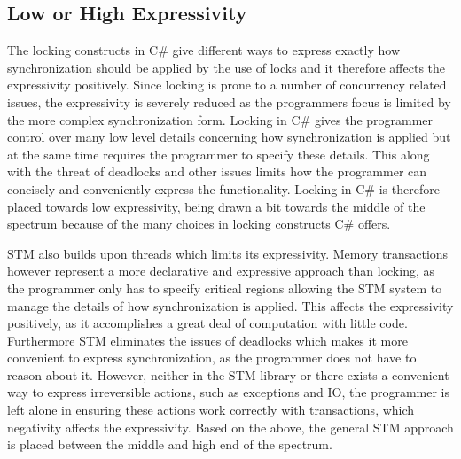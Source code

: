 \subsection{Low or High Expressivity}\label{subsec:expressivity}
The locking constructs in C\# give different ways to express exactly how synchronization should be applied by the use of locks and it therefore affects the expressivity positively. Since locking is prone to a number of concurrency related issues, the expressivity is severely reduced as the programmers focus is limited by the more complex synchronization form. Locking in C\# gives the programmer control over many low level details concerning how synchronization is applied but at the same time requires the programmer to specify these details. This along with the threat of deadlocks and other issues limits how the programmer can concisely and conveniently express the functionality. Locking in C\# is therefore placed towards low expressivity, being drawn a bit towards the middle of the spectrum because of the many choices in locking constructs C\# offers.

\ac{STM} also builds upon threads which limits its expressivity. Memory transactions however represent a more declarative and expressive approach than locking, as the programmer only has to specify critical regions allowing the \ac{STM} system to manage the details of how synchronization is applied. This affects the expressivity positively, as it accomplishes a great deal of computation with little code. Furthermore \ac{STM} eliminates the issues of deadlocks which makes it more convenient to express synchronization, as the programmer does not have to reason about it. However, neither in the \ac{STM} library or \stmname there exists a convenient way to express irreversible actions, such as exceptions and \ac{IO}, the programmer is left alone in ensuring these actions work correctly with transactions, which negativity affects the expressivity. Based on the above, the general \ac{STM} approach is placed between the middle and high end of the spectrum.

